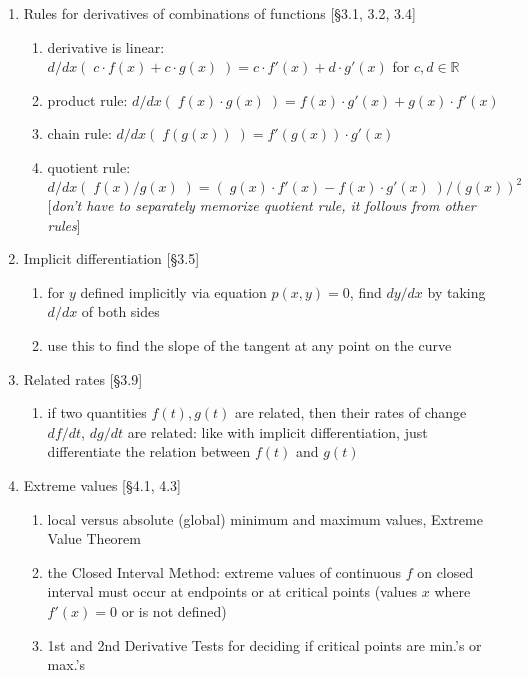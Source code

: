 \documentclass[11pt]{article}
\begin{document}
\begin{enumerate}
\item Rules for derivatives of combinations of functions [\S 3.1, 3.2, 3.4]
\begin{enumerate}
\item derivative is linear: $d/dx( \; c\cdot f(x) + c\cdot g(x) \;) = c \cdot f'(x) + d \cdot g'(x)$ for $c,d \in \mathbb{R}$
\item product rule: $d/dx( \; f(x)\cdot g(x) \;) = f(x) \cdot g'(x) + g(x) \cdot f'(x)$
\item chain rule: $d/dx (\; f(g(x)) \; ) = f'(g(x)) \cdot g'(x)$
\item quotient rule: $\displaystyle d/dx (\; f(x)/g(x) \;) = (\; g(x)\cdot f'(x) - f(x)\cdot g'(x) \; )/(g(x))^2$\\ {[\emph{don't have to separately memorize quotient rule, it follows from other rules}]}
\end{enumerate}

\item Implicit differentiation [\S 3.5]
\begin{enumerate}
\item for $y$ defined implicitly via equation $p(x,y)=0$, find $dy/dx$ by taking $d/dx$ of both sides
\item use this to find the slope of the tangent at any point on the curve
\end{enumerate}

\item Related rates [\S 3.9]
\begin{enumerate}
\item if two quantities $f(t), g(t)$ are related, then their rates of change $df/dt$, $dg/dt$ are related: like with implicit differentiation, just differentiate the relation between $f(t)$ and $g(t)$
\end{enumerate}

\item Extreme values [\S 4.1, 4.3]
\begin{enumerate}
\item local versus absolute (global) minimum and maximum values, Extreme Value Theorem
\item the Closed Interval Method: extreme values of continuous $f$ on closed interval must occur at endpoints or at critical points (values $x$ where $f'(x)=0$ or is not defined)
\item 1st and 2nd Derivative Tests for deciding if critical points are min.'s or max.'s
\end{enumerate}


\end{enumerate}
\end{document}
